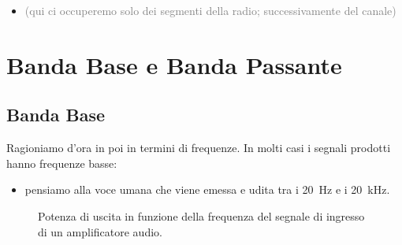 \documentclass[openany,a4paper,12pt]{book}
\begin{document}
\vspace{0.5cm}
\begin{itemize}[label=\textcolor{gray}{\textbullet}]
    \item \textcolor{gray}{(qui ci occuperemo solo dei segmenti della radio; successivamente del canale)}
\end{itemize}

\section{Banda Base e Banda Passante}
\subsection*{Banda Base}
Ragioniamo d'ora in poi in termini di frequenze. In molti casi i segnali prodotti hanno frequenze basse:
\begin{itemize}[label=\textcolor{PoliBlue}{\textbullet}]
    \item pensiamo alla voce umana che viene emessa e udita tra i \qty{20}{\hertz} e i \qty{20}{\kilo\hertz}.
\end{itemize}

\begin{figure}[H]
    \centering
    \caption*{Potenza di uscita in funzione della frequenza del segnale di ingresso di un amplificatore audio.}
\end{figure}
\end{document}
